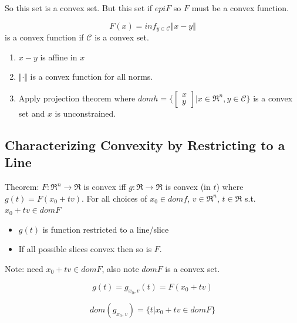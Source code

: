 So this set is a convex set. But this set if $epiF$ so $F$ must be a convex function. 

\begin{example}
	


\begin{equation*}
F(x) = inf_{y\in\mathcal{C}}\Vert x-y\Vert
\end{equation*}
is a convex function if $\mathcal{C}$ is a convex set. 

\begin{enumerate}
	\item $x-y$ is affine in $x$
	
	\item $\Vert\cdot\Vert$ is a convex function for all norms.
	
	\item Apply projection theorem where $domh = \{\begin{bmatrix}
	x\\
	y
	\end{bmatrix}\vert x\in \Re^n, y\in \mathcal{C} \}$ is a convex set and $x$ is unconstrained. 
\end{enumerate}
\end{example}
\subsection{Characterizing Convexity by Restricting to a Line}

Theorem: $F: \Re^n \rightarrow \Re$ is convex iff $g:\Re \rightarrow \Re$ is convex (in $t$) where $g(t) =F(x_0 + tv)$. For all choices of $x_0\in domf$, $v\in \Re^n$, $t\in \Re$ s.t. $x_0+tv\in domF$

\begin{itemize}
	\item $g(t)$ is function restricted to a line/slice
	
	\item If all possible slices convex then so is $F$.
\end{itemize}

Note: need $x_0+tv\in domF$, also note $domF$ is a convex set. 

\begin{equation*}
g(t) = g_{x_0, v}(t) = F(x_0+tv)
\end{equation*}

\begin{equation*}
dom(g_{x_0, v}) = \{t|x_0+tv \in domF \}
\end{equation*}

